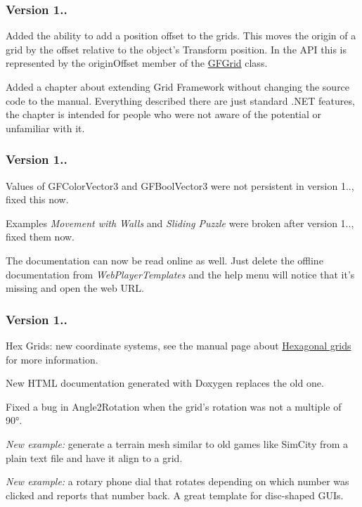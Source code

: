 \subsubsection*{Version 1..}


\begin{DoxyItemize}
\item Added the ability to add a position offset to the grids. This moves the origin of a grid by the offset relative to the object's Transform position. In the A\+P\+I this is represented by the {\ttfamily origin\+Offset} member of the {\ttfamily \hyperlink{class_g_f_grid}{G\+F\+Grid}} class.
\item Added a chapter about extending Grid Framework without changing the source code to the manual. Everything described there are just standard .N\+E\+T features, the chapter is intended for people who were not aware of the potential or unfamiliar with it.
\end{DoxyItemize}

\subsubsection*{Version 1..}


\begin{DoxyItemize}
\item Values of G\+F\+Color\+Vector3 and G\+F\+Bool\+Vector3 were not persistent in version 1.., fixed this now.
\item Examples {\itshape Movement with Walls} and {\itshape Sliding Puzzle} were broken after version 1.., fixed them now.
\item The documentation can now be read online as well. Just delete the offline documentation from {\itshape Web\+Player\+Templates} and the help menu will notice that it's missing and open the web U\+R\+L.
\end{DoxyItemize}

\subsubsection*{Version 1..}


\begin{DoxyItemize}
\item Hex Grids\+: new coordinate systems, see the manual page about \hyperlink{hex_grid}{Hexagonal grids} for more information.
\item New H\+T\+M\+L documentation generated with Doxygen replaces the old one.
\item Fixed a bug in {\ttfamily Angle2\+Rotation} when the grid's rotation was not a multiple of 90°.
\item {\itshape New example\+:} generate a terrain mesh similar to old games like Sim\+City from a plain text file and have it align to a grid.
\item {\itshape New example\+:} a rotary phone dial that rotates depending on which number was clicked and reports that number back. A great template for disc-\/shaped G\+U\+Is.
\end{DoxyItemize}

